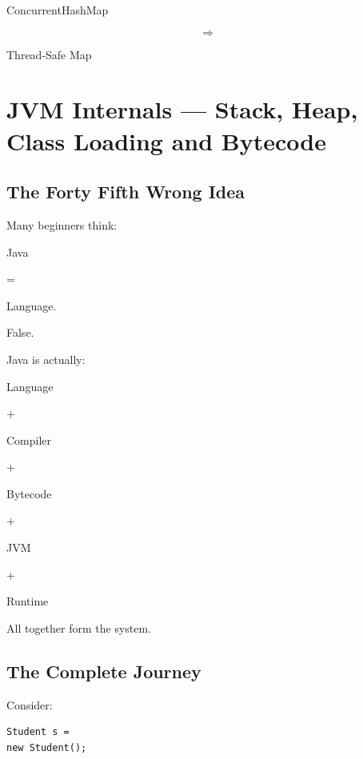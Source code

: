 \documentclass[11pt,a4paper]{book}
\begin{document}
ConcurrentHashMap

\[
\Rightarrow
\]

Thread-Safe Map

\chapter[JVM Internals]{JVM Internals --- Stack, Heap, Class Loading and Bytecode}
%

\section{The Forty Fifth Wrong Idea}

\begin{trap}

Many beginners think:

Java

=

Language.


False.


Java is actually:


Language

+

Compiler

+

Bytecode

+

JVM

+

Runtime


All together form the system.

\end{trap}


\section{The Complete Journey}

Consider:

\begin{verbatim} 
Student s =
new Student();
\end{verbatim}
\end{document}
